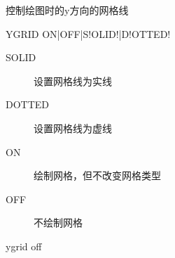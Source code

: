 \label{cmd:ygrid}

控制绘图时的y方向的网格线

\begin{SACSTX}
YGRID ON|OFF|S!OLID!|D!OTTED!
\end{SACSTX}

\begin{description}
\item [SOLID] 设置网格线为实线
\item [DOTTED] 设置网格线为虚线
\item [ON] 绘制网格，但不改变网格类型
\item [OFF] 不绘制网格
\end{description}

\begin{SACDFT}
ygrid off
\end{SACDFT}
